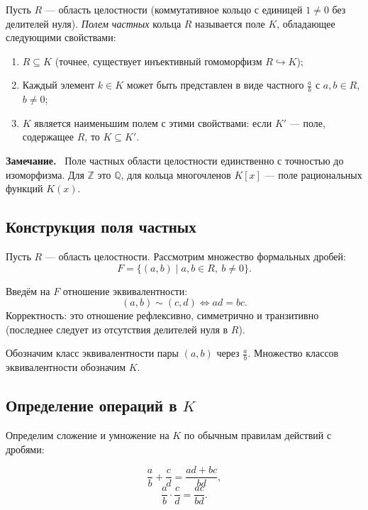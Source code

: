 \documentclass[a4paper,12pt]{article}
\newcommand{\myremark}{\textbf{Замечание.}\ }
\theoremstyle{definition}
\theoremstyle{plain}
\theoremstyle{remark}
\begin{document}
	\begin{tcolorbox}[colback=blue!5, colframe=blue!40!black, title=Определение]
		Пусть \( R \) — область целостности (коммутативное кольцо с единицей \( 1 \neq 0 \) без делителей нуля). \textit{Полем частных} кольца \( R \) называется поле \( K \), обладающее следующими свойствами:
		\begin{enumerate}
			\item \( R \subseteq K \) (точнее, существует инъективный гомоморфизм \( R \hookrightarrow K \));
			\item Каждый элемент \( k \in K \) может быть представлен в виде частного \( \frac{a}{b} \) с \( a, b \in R \), \( b \neq 0 \);
			\item \( K \) является наименьшим полем с этими свойствами: если \( K' \) — поле, содержащее \( R \), то \( K \subseteq K' \).
		\end{enumerate}
	\end{tcolorbox}
	
	\myremark
	Поле частных области целостности единственно с точностью до изоморфизма. Для \( \mathbb{Z} \) это \( \mathbb{Q} \), для кольца многочленов \( K[x] \) — поле рациональных функций \( K(x) \).
	
	\subsection{Конструкция поля частных}
	
	Пусть \( R \) — область целостности. Рассмотрим множество формальных дробей:
	\[
	F = \{ (a, b) \mid a, b \in R, \ b \neq 0 \}.
	\]
	
	Введём на \( F \) отношение эквивалентности:
	\[
	(a, b) \sim (c, d) \iff ad = bc.
	\]
	Корректность: это отношение рефлексивно, симметрично и транзитивно (последнее следует из отсутствия делителей нуля в \( R \)).
	
	Обозначим класс эквивалентности пары \( (a, b) \) через \( \frac{a}{b} \). Множество классов эквивалентности обозначим \( K \).
	
	\subsection{Определение операций в \( K \)}
	
	Определим сложение и умножение на \( K \) по обычным правилам действий с дробями:
	
	\[
	\frac{a}{b} + \frac{c}{d} = \frac{ad + bc}{bd},
	\]
	\[
	\frac{a}{b} \cdot \frac{c}{d} = \frac{ac}{bd}.
	\]
	
\end{document}
